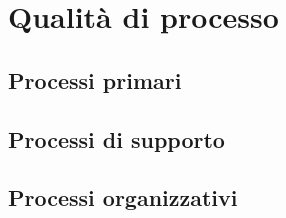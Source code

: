 \chapter{Qualità di processo}
\section{Processi primari}
\section{Processi di supporto}
\section{Processi organizzativi}
